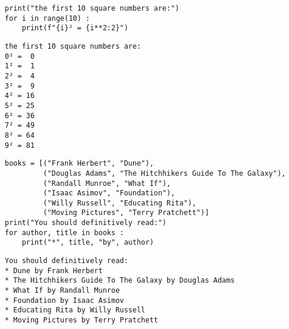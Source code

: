 
\begin{frame}[fragile]
%
\begin{codebox}
\begin{verbatim}
print("the first 10 square numbers are:")
for i in range(10) :
    print(f"{i}² = {i**2:2}")
\end{verbatim}
\end{codebox}
%
\begin{cmdbox}
\begin{verbatim}
the first 10 square numbers are:
0² =  0
1² =  1
2² =  4
3² =  9
4² = 16
5² = 25
6² = 36
7² = 49
8² = 64
9² = 81
\end{verbatim}
\end{cmdbox}
%
\end{frame}


\begin{frame}[fragile]
%
\begin{codebox}
\begin{verbatim}
books = [("Frank Herbert", "Dune"),
         ("Douglas Adams", "The Hitchhikers Guide To The Galaxy"),
         ("Randall Munroe", "What If"),
         ("Isaac Asimov", "Foundation"),
         ("Willy Russell", "Educating Rita"),
         ("Moving Pictures", "Terry Pratchett")]
print("You should definitively read:")
for author, title in books :
    print("*", title, "by", author)
\end{verbatim}
\end{codebox}
%
\begin{cmdbox}
\begin{verbatim}
You should definitively read:
* Dune by Frank Herbert
* The Hitchhikers Guide To The Galaxy by Douglas Adams
* What If by Randall Munroe
* Foundation by Isaac Asimov
* Educating Rita by Willy Russell
* Moving Pictures by Terry Pratchett
\end{verbatim}
\end{cmdbox}
%
\end{frame}

